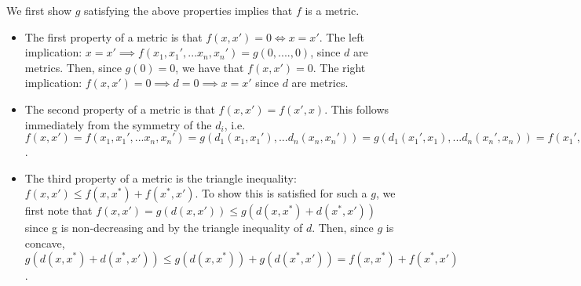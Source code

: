 \documentclass{article}
\begin{document}
We first show $g$ satisfying the above properties implies that $f$ is a metric.
\begin{itemize}
    \item The first property of a metric is that $f(x,x') = 0 \Longleftrightarrow x = x'$.  The left implication: $x = x' \implies f(x_1, x_1', ... x_n, x_n') = g(0,....,0)$, since $d$ are metrics.  Then, since $g(0) = 0$, we have that $f(x,x') = 0$. The right implication: $f(x,x') = 0 \implies  d = 0 \implies x = x'$ since $d$ are metrics.
    \item The second property of a metric is that $f(x,x') = f(x',x)$. This follows immediately from the symmetry of the $d_i$, i.e. $f(x,x') = f(x_1, x_1', ... x_n, x_n') = g(d_1(x_1, x_1'), ... d_n(x_n, x_n')) = g(d_1(x_1', x_1), ... d_n(x_n', x_n)) =  f(x_1', x_1, ... x_n', x_n) = f(x',x)$.
    \item The third property of a metric is the triangle inequality: $f(x, x') \leq f(x, x^*) +  f(x^*, x') $.  To show this is satisfied for such a $g$, we first note that $f(x,x') = g(d(x,x')) \leq g(d(x, x^*) + d(x^*, x')) $ since g is non-decreasing and by the triangle inequality of $d$. Then, since $g$ is concave, $g(d(x, x^*) + d(x^*, x')) \leq g(d(x, x^*)) + g(d(x^*, x')) = f(x,x^*) + f(x^*, x')$.
    
\end{itemize}
\end{document}
